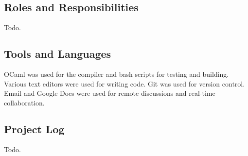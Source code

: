 \subsection{Roles and Responsibilities}
Todo.\\

\subsection{Tools and Languages}
OCaml was used for the compiler and bash scripts for testing and building. Various text editors were used for writing code. Git was used for version control. Email and Google Docs were used for remote discussions and real-time collaboration.

\subsection{Project Log}
Todo.\\
